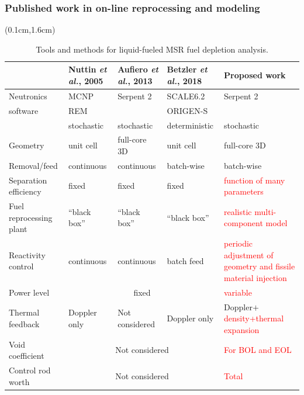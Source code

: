 \begin{frame}
\frametitle{Published work in on-line reprocessing and modeling}

  \begin{textblock*}{12.5cm}(0.1cm,1.6cm) %
	\begin{table}[t]
	\fontsize{7}{9}\selectfont
	\caption{Tools and methods for liquid-fueled \gls{MSR} fuel depletion 
	analysis.}
			\vspace{-2mm}
	\begin{tabularx}{\textwidth}{p{2.5cm} X X X p{3cm}} 
		\hline 
		&Nuttin \emph{et al.}, 2005 \cite{nuttin_potential_2005}& Aufiero \emph{et al.}, 
		2013 \cite{aufiero_extended_2013} & Betzler \emph{et al.}, 2018 
		\cite{betzler_fuel_2018}&Proposed work \\ 
		\hline
		Neutronics & \gls{MCNP} & Serpent 2 & SCALE6.2 & Serpent 2 \\
		software   & REM &           & ORIGEN-S &  \\
	               & stochastic & stochastic & deterministic & stochastic\\ [3pt]
		Geometry  & unit cell & full-core 3D & unit cell & full-core 3D\\ [3pt]
		Removal/feed  & continuous &continuous & batch-wise & batch-wise\\ [3pt]
        Separation efficiency & fixed & fixed & fixed & \textcolor{red}{function of many parameters} \\[3pt]
        Fuel reprocessing plant & ``black box'' & ``black box'' & ``black box'' & \textcolor{red}{realistic multi-component model} \\[3pt]
        Reactivity control & continuous& continuous & batch feed & 
        \textcolor{red}{periodic adjustment of geometry and fissile material 
        injection}\\[3pt]
        Power level & \multicolumn{3}{c}{fixed}& \textcolor{red}{variable} 
        \\[3pt]
		Thermal feedback & Doppler only & Not considered & Doppler only & 
		Doppler$+$\textcolor{red}{density+thermal expansion}\\[3pt]
		Void coefficient  & \multicolumn{3}{c}{Not considered} & 
		\textcolor{red}{For BOL and EOL} \\[3pt]
		Control rod worth & \multicolumn{3}{c}{Not considered} & 
		\textcolor{red}{Total} \\[3pt]
		\hline
	\end{tabularx}
	\label{tab:msr_codes}
\end{table}
\end{textblock*}

\end{frame}


